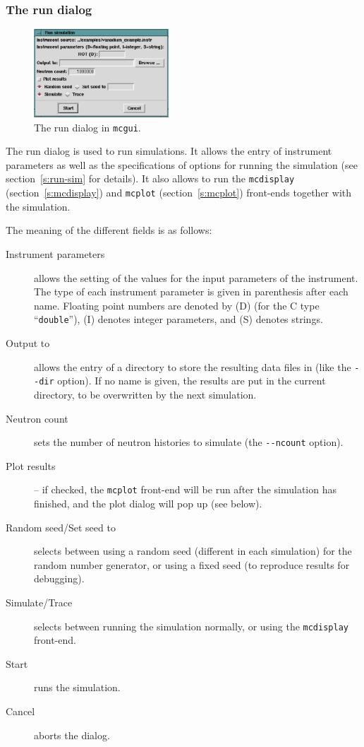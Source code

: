 \subsubsection{The run dialog}

\begin{figure}[th]
  \begin{center}
    \includegraphics[width=0.45\textwidth]{figures/mcgui-run.eps}
  \end{center}
\caption{The run dialog in \texttt{mcgui}.}
\label{fig:mcgui-run}
\end{figure}
%
The run dialog is used to run simulations. It allows the entry of
instrument parameters as well as the specifications of options for
running the simulation (see section~\ref{s:run-sim} for details). It
also allows to run the \verb+mcdisplay+ (section~\ref{s:mcdisplay}) and
\verb+mcplot+ (section~\ref{s:mcplot}) front-ends together with the
simulation.

The meaning of the different fields is as follows:
\begin{description}
\item[Instrument parameters] allows the setting of the values for
  the input parameters of the instrument. The type of each instrument
  parameter is given in parenthesis after each name. Floating point
  numbers are denoted by (D) (for the C type ``\verb+double+''), (I)
  denotes integer parameters, and (S) denotes strings.
\item[Output to] allows the entry of a directory to store the
  resulting data files in (like the \verb+--dir+ option). If no name is
  given, the results are put in the current directory, to be overwritten
  by the next simulation.
\item[Neutron count] sets the number of neutron histories to
  simulate (the \verb+--ncount+ option).
\item[Plot results] -- if checked, the \verb+mcplot+ front-end will be run
  after the simulation has finished, and the plot dialog will pop up
  (see below).
\item[Random seed/Set seed to] selects between using a random seed (different
  in each simulation) for the random number generator, or using a fixed
  seed (to reproduce results for debugging).
\item[Simulate/Trace] selects between running the simulation
  normally, or using the \verb+mcdisplay+ front-end.
\item[Start] runs the simulation.
\item[Cancel] aborts the dialog.
\end{description}

